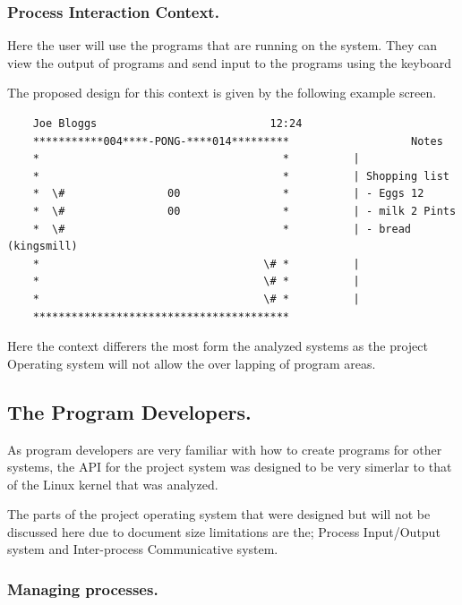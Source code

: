 \documentclass[a4paper]{report}
\begin{document}
\subsubsection*{Process Interaction Context.}

Here the user will use the programs that are running on the system. They can view the output of programs and send input to the programs using the keyboard

The proposed design for this context is given by the following example screen.

{\ttfamily \small
  \begin{framed}
    \begin{verbatim}
    Joe Bloggs                           12:24
    ***********004****-PONG-****014*********                   Notes
    *                                      *          |
    *                                      *          | Shopping list
    *  \#                00                *          | - Eggs 12
    *  \#                00                *          | - milk 2 Pints
    *  \#                                  *          | - bread (kingsmill)
    *                                   \# *          |
    *                                   \# *          |
    *                                   \# *          |
    ****************************************
    \end{verbatim}
  \end{framed}
}

Here the context differers the most form the analyzed systems as the project Operating system will not allow the over lapping of program areas.



\subsection*{The Program Developers.}

As program developers are very familiar with how to create programs for other systems, the API for the project system was designed to be very simerlar to that of the Linux kernel that was analyzed.

The parts of the project operating system that were designed but will not be discussed here due to document size limitations are the; Process Input/Output system and Inter-process Communicative system.

\subsubsection*{Managing processes.}
\end{document}
